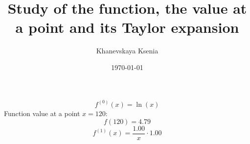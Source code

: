 \documentclass[12pt, letterpaper]{article}
\title {Study of the function, the value at a point and its Taylor expansion}
\author{Khanevskaya Ksenia}
\date{\today}
\begin{document}
\maketitle
\[f^{(0)}(x)=\ln(x)\]
Function value at a point $x=120$: \[f(120)=4.79\]
\[f^{(1)}(x)=\frac{1.00}{x}\cdot1.00\]
\end{document}
